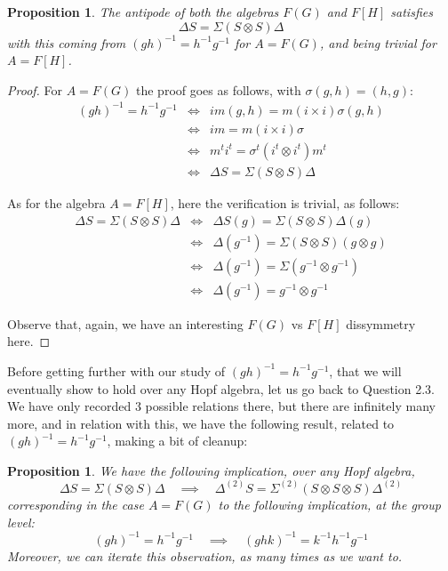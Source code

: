 \documentclass[12pt]{amsbook}
\newtheorem{proposition}[theorem]{Proposition}
\begin{document}
\begin{proposition}
The antipode of both the algebras $F(G)$ and $F[H]$ satisfies
$$\Delta S=\Sigma(S\otimes S)\Delta$$
with this coming from $(gh)^{-1}=h^{-1}g^{-1}$ for $A=F(G)$, and being trivial for $A=F[H]$.
\end{proposition}

\begin{proof}
For $A=F(G)$ the proof goes as follows, with $\sigma(g,h)=(h,g)$:
\begin{eqnarray*}
(gh)^{-1}=h^{-1}g^{-1}
&\iff&im(g,h)=m(i\times i)\sigma(g,h)\\
&\iff&im=m(i\times i)\sigma\\
&\iff&m^ti^t=\sigma^t(i^t\otimes i^t)m^t\\
&\iff&\Delta S=\Sigma(S\otimes S)\Delta
\end{eqnarray*}

As for the algebra $A=F[H]$, here the verification is trivial, as follows:
\begin{eqnarray*}
\Delta S=\Sigma(S\otimes S)\Delta
&\iff&\Delta S(g)=\Sigma(S\otimes S)\Delta(g)\\
&\iff&\Delta(g^{-1})=\Sigma(S\otimes S)(g\otimes g)\\
&\iff&\Delta(g^{-1})=\Sigma(g^{-1}\otimes g^{-1})\\
&\iff&\Delta(g^{-1})=g^{-1}\otimes g^{-1}
\end{eqnarray*}

Observe that, again, we have an interesting $F(G)$ vs $F[H]$ dissymmetry here.
\end{proof}

Before getting further with our study of $(gh)^{-1}=h^{-1}g^{-1}$, that we will eventually show to hold over any Hopf algebra, let us go back to Question 2.3. We have only recorded 3 possible relations there, but there are infinitely many more, and in relation with this, we have the following result, related to $(gh)^{-1}=h^{-1}g^{-1}$, making a bit of cleanup:

\begin{proposition}
We have the following implication, over any Hopf algebra,
$$\Delta S=\Sigma(S\otimes S)\Delta\quad\implies\quad\Delta^{(2)}S=\Sigma^{(2)}(S\otimes S\otimes S)\Delta^{(2)}$$
corresponding in the case $A=F(G)$ to the following implication, at the group level:
$$(gh)^{-1}=h^{-1}g^{-1}\quad\implies\quad (ghk)^{-1}=k^{-1}h^{-1}g^{-1}$$
Moreover, we can iterate this observation, as many times as we want to.
\end{proposition}
\end{document}
